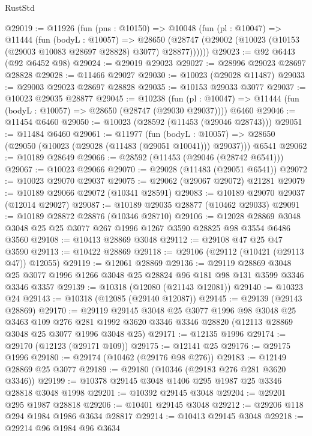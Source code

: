 \begin{lexlean}{RustStd}
\begin{coremodule}
@29019 := @11926
    (fun (pns : @10150) =>
    @10048
      (fun (pl : @10047) =>
      @11444
        (fun (bodyL : @10057) =>
        @28650 (@28747 (@29002 (@10023 (@10153 (@29003 @10083 @28697 @28828) @3077) @28877))))))
@29023 := @92 @6443 (@92 @6452 @98)
@29024 := @29019 @29023
@29027 := @28996 @29023 @28697 @28828
@29028 := @11466 @29027
@29030 := @10023 (@29028 @11487)
@29033 := @29003 @29023 @28697 @28828
@29035 := @10153 @29033 @3077
@29037 := @10023 @29035 @28877
@29045 := @10238
    (fun (pl : @10047) => @11444 (fun (bodyL : @10057) => @28650 (@28747 (@29030 @29037))))
    @6460
@29046 := @11454 @6460
@29050 := @10023 (@28592 (@11453 (@29046 @28743)))
@29051 := @11484 @6460
@29061 := @11977
    (fun (bodyL : @10057) => @28650 (@29050 (@10023 (@29028 (@11483 (@29051 @10041))) @29037)))
    @6541
@29062 := @10189 @28649
@29066 := @28592 (@11453 (@29046 (@28742 @6541)))
@29067 := @10023 @29066
@29070 := @29028 (@11483 (@29051 @6541))
@29072 := @10023 @29070 @29037
@29075 := @29062 (@29067 @29072) @21281
@29079 := @10189 @29066 @29072 (@10341 @28591)
@29083 := @10189 @29070 @29037 (@12014 @29027)
@29087 := @10189 @29035 @28877 (@10462 @29033)
@29091 := @10189 @28872 @28876 (@10346 @28710)
@29106 := @12028
    @28869
    @3048
    @3048
    @25
    @25
    @3077
    @267
    @1996
    @1267
    @3590
    @28825
    @98
    @3554
    @6486
    @3560
@29108 := @10413 @28869 @3048
@29112 := @29108 @47 @25 @47 @3590
@29113 := @10422 @28869
@29118 := @29106 (@29112 (@10421 (@29113 @47)) @12055)
@29119 := @12061 @28869
@29136 := @29119
    @28869
    @3048
    @25
    @3077
    @1996
    @1266
    @3048
    @25
    @28824
    @96
    @181
    @98
    @131
    @3599
    @3346
    @3346
    @3357
@29139 := @10318 (@12080 (@21143 @12081))
@29140 := @10323 @24
@29143 := @10318 (@12085 (@29140 @12087))
@29145 := @29139 (@29143 @28869)
@29170 := @29119
    @29145
    @3048
    @25
    @3077
    @1996
    @98
    @3048
    @25
    @3463
    @109
    @276
    @281
    @1992
    @3620
    @3346
    @3346
    @28820
    (@12113 @28869 @3048 @25 @3077 @1996 @3048 @25)
@29171 := @12135 @1996
@29174 := @29170 (@12123 (@29171 @109))
@29175 := @12141 @25
@29176 := @29175 @1996
@29180 := @29174 (@10462 (@29176 @98 @276))
@29183 := @12149 @28869 @25 @3077
@29189 := @29180 (@10346 (@29183 @276 @281 @3620 @3346))
@29199 := @10378 @29145 @3048 @1406 @295 @1987 @25 @3346 @28818 @3048 @1998
@29201 := @10392 @29145 @3048
@29204 := @29201 @295 @1987 @28818
@29206 := @10401 @29145 @3048
@29212 := @29206 @118 @294 @1984 @1986 @3634 @28817
@29214 := @10413 @29145 @3048
@29218 := @29214 @96 @1984 @96 @3634

\end{coremodule}
\end{lexlean}
